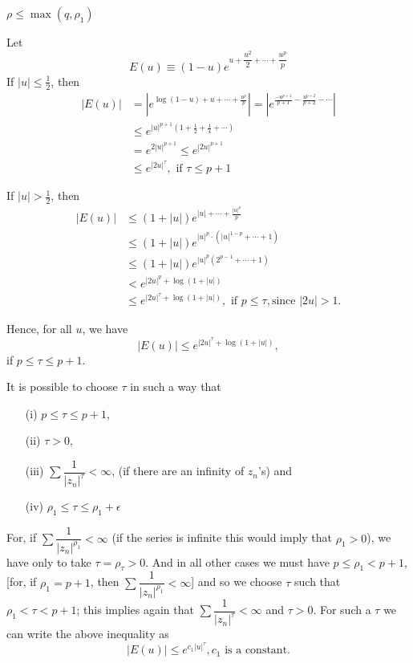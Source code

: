 \begin{thm}\label{chap5:thm2}
$\rho \leq \max (q , \rho_1)$ 

Let
$$
E(u) \equiv (1-u) e^{u + \dfrac{u^2}{2} +  \cdots + \dfrac{u^p}{p}}
$$
If $|u| \leq \frac{1}{2}$, then
\begin{align*}
|E(u)| & = \left| e^{\log (1-u) + u + \cdots +\frac{u^p}{p}} \right| =
\left|e^{\frac{-u^{p+1}}{p+1} - \frac{u^{p+2}}{p+2} - \cdots}
\right|\\
& \leq e^{|u|^{p+1} (1+ \frac{1}{2} + \frac{1}{4} + \cdots)}\\
& = e^{2|u|^{p+1}} \leq e^{|2u|^{p+1}}\\
& \leq e^{|2u|^\tau}, \text{ if } \tau \leq p +1
\end{align*}

If $|u| > \frac{1}{2}$, then
\begin{align*}
|E(u)| & \leq (1+|u|) e^{|u| + \cdots + \frac{|u|^p}{p}}\\
& \leq (1+|u|) e^{|u|^p \cdot (|u|^{1-p} + \cdots + 1 )}\\
& \leq (1 + |u|) e^{|u|^p (2^{p-1} + \cdots +1)}  \\
& < e^{|2u|^p + \log (1+|u|)}\\
& \leq e^{|2u|^\tau + \log (1+|u|)}, \text{ if } p \leq \tau, \text{
  since } |2u| >1.
\end{align*}\pageoriginale

Hence, for all $u$, we have
$$
|E(u)| \leq e^{|2u|^\tau + \log (1+|u|)},
$$
if $p \leq \tau \leq p +1$.

It is possible to choose $\tau$ in such a way that 
\begin{itemize}
\item[(i)] $p \leq \tau \leq p +1$,

\item[(ii)] $\tau > 0$,

\item[(iii)] $\sum \dfrac{1}{|z_n|^\tau} < \infty$, (if there are an
  infinity of $z_n$'s) and

\item[(iv)] $\rho_1 \leq \tau \leq \rho_1 + \epsilon$
\end{itemize}

For, if $\sum\dfrac{1}{|z_n|^{ \rho_1}} < \infty$ (if the series is
infinite this would imply that $\rho_1 > 0$), we have only to take
$\tau = \rho_\tau > 0$. And in all other cases we must have $p \leq
\rho_1 < p +1$, [for, if $\rho_1 = p +1$, then
  $\sum\dfrac{1}{|z_n|^{\rho_1}} < \infty$] and so we choose $\tau$ such
that $\rho_1 < \tau < p + 1$; this implies again that $\sum
\dfrac{1}{|z_n|^\tau }< \infty$ and $\tau > 0$. For such a $\tau$ we
can write the above inequality as
$$
|E(u)| \leq e^{c_1|u|^\tau}, c_1 \text{ is a constant.}
$$


\end{thm}
